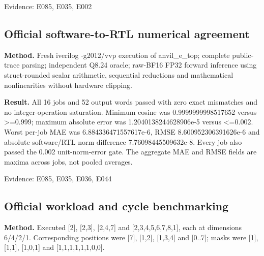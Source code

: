 \documentclass[11pt,a4paper]{article}
\begin{document}
{\small Evidence: E085,\allowbreak{} E035,\allowbreak{} E002}

\subsection{Official software-to-RTL numerical agreement}

\textbf{Method.} Fresh iverilog -g2012/\allowbreak{}vvp execution of anvil\_\allowbreak{}e\_\allowbreak{}top; complete public-trace parsing; independent Q8.24 oracle; raw-BF16 FP32 forward inference using struct-rounded scalar arithmetic,\allowbreak{} sequential reductions and mathematical nonlinearities without hardware clipping.

\textbf{Result.} All 16 jobs and 52 output words passed with zero exact mismatches and no integer-operation saturation. Minimum cosine was 0.9999999998517652 versus >=\allowbreak{}0.999; maximum absolute error was 1.2040138244628906e-5 versus <=\allowbreak{}0.002. Worst per-job MAE was 6.884336471557617e-6,\allowbreak{} RMSE 8.600952306391626e-6 and absolute software/\allowbreak{}RTL norm difference 7.76098445509632e-8. Every job also passed the 0.002 unit-norm-error gate. The aggregate MAE and RMSE fields are maxima across jobs,\allowbreak{} not pooled averages.

{\small Evidence: E085,\allowbreak{} E035,\allowbreak{} E036,\allowbreak{} E044}

\subsection{Official workload and cycle benchmarking}

\textbf{Method.} Executed [\allowbreak{}2]\allowbreak{},\allowbreak{} [\allowbreak{}2,\allowbreak{}3]\allowbreak{},\allowbreak{} [\allowbreak{}2,\allowbreak{}4,\allowbreak{}7]\allowbreak{} and [\allowbreak{}2,\allowbreak{}3,\allowbreak{}4,\allowbreak{}5,\allowbreak{}6,\allowbreak{}7,\allowbreak{}8,\allowbreak{}1]\allowbreak{},\allowbreak{} each at dimensions 6/\allowbreak{}4/\allowbreak{}2/\allowbreak{}1. Corresponding positions were [\allowbreak{}7]\allowbreak{},\allowbreak{} [\allowbreak{}1,\allowbreak{}2]\allowbreak{},\allowbreak{} [\allowbreak{}1,\allowbreak{}3,\allowbreak{}4]\allowbreak{} and [\allowbreak{}0..7]\allowbreak{}; masks were [\allowbreak{}1]\allowbreak{},\allowbreak{} [\allowbreak{}1,\allowbreak{}1]\allowbreak{},\allowbreak{} [\allowbreak{}1,\allowbreak{}0,\allowbreak{}1]\allowbreak{} and [\allowbreak{}1,\allowbreak{}1,\allowbreak{}1,\allowbreak{}1,\allowbreak{}1,\allowbreak{}1,\allowbreak{}0,\allowbreak{}0]\allowbreak{}.
\end{document}

